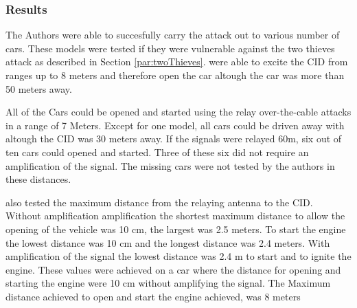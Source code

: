 \subsubsection*{Results}
	The Authors were able to succesfully carry the attack out to various number of cars.
	These models were tested if they were vulnerable against the two thieves attack as described in 
	Section \ref{par:twoThieves}.
	\citeauthor{relayAttacksFranc} were able to excite the CID from ranges up to 8 meters
	and therefore open the car altough the car was more than 50 meters away.

	All of the Cars could be opened and started using the relay over-the-cable attacks in a range of 7 Meters.
	Except for one model,
	all cars could be driven away with altough the CID was 30 meters away.
	If the signals were relayed 60m,
	six out of ten cars could opened and started.
	Three of these six did not require an amplification of the signal.
	The missing cars were not tested by the authors in these distances.

	\citeauthor{relayAttacksFranc} also tested the maximum distance from the relaying antenna to the CID.
	Without amplification amplification the shortest maximum distance to allow the opening of the vehicle was 10 cm,
	the largest was 2.5 meters.
	To start the engine the lowest distance was 10 cm and the longest distance was 2.4 meters.
	With amplification of the signal the lowest distance was 2.4 m to start and to ignite the engine.
	These values were achieved on a car where the distance for opening and starting the engine were 10 cm
	without amplifying the signal.
	The Maximum distance achieved to open and start the engine achieved,
	was 8 meters
	
